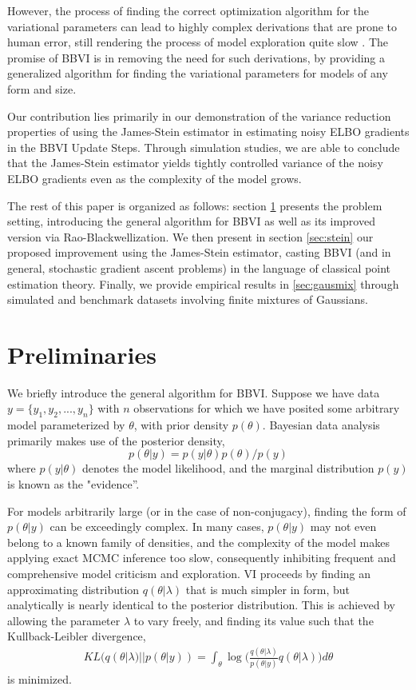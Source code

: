 \documentclass{article}
\begin{document}
However, the process of finding the correct optimization algorithm for the variational parameters can lead to highly complex derivations that are prone to human error, still rendering the process of model exploration quite slow \cite{Blei-2017}. The promise of BBVI is in removing the need for such derivations, by providing a generalized algorithm for finding the variational parameters for models of any form and size.

Our contribution lies primarily in our demonstration of the variance reduction properties of using the James-Stein estimator in estimating noisy ELBO gradients in the BBVI Update Steps. Through simulation studies, we are able to conclude that the James-Stein estimator yields tightly controlled variance of the noisy ELBO gradients even as the complexity of the model grows.

The rest of this paper is organized as follows: section \ref{sec:bbvi} presents the problem setting, introducing the general algorithm for BBVI as well as its improved version via Rao-Blackwellization. We then present in section \ref{sec:stein} our proposed improvement using the James-Stein estimator, casting BBVI (and in general, stochastic gradient ascent problems) in the language of classical point estimation theory. Finally, we provide empirical results in \ref{sec:gausmix} through simulated and benchmark datasets involving finite mixtures of Gaussians.

\section{Preliminaries}
\label{sec:bbvi}

We briefly introduce the general algorithm for BBVI. Suppose we have data $y = \{y_1, y_2,..., y_n\}$ with $n$ observations for which we have posited some arbitrary model parameterized by $\theta$, with prior density $p(\theta)$. Bayesian data analysis primarily makes use of the posterior density,
$$
p(\theta | y) = p(y | \theta) p(\theta) / p(y)
$$
where $p(y | \theta)$ denotes the model likelihood, and the marginal distribution $p(y)$ is known as the "evidence''.

For models arbitrarily large (or in the case of non-conjugacy), finding the form of $p(\theta | y)$ can be exceedingly complex. In many cases, $p(\theta | y)$ may not even belong to a known family of densities, and the complexity of the model makes applying exact MCMC inference too slow, consequently inhibiting frequent and comprehensive model criticism and exploration. VI proceeds by finding an approximating distribution $q(\theta | \lambda)$ that is much simpler in form, but analytically is nearly identical to the posterior distribution. This is achieved by allowing the parameter $\lambda$ to vary freely, and finding its value such that the Kullback-Leibler divergence,
\begin{align}
\label{eq:kullback}
KL(q(\theta | \lambda)||p(\theta|y)) = \int_{\theta} \log\bigg( \frac{q(\theta | \lambda)}{p(\theta|y)} q(\theta | \lambda) \bigg)d\theta
\end{align}
is minimized.
\end{document}
